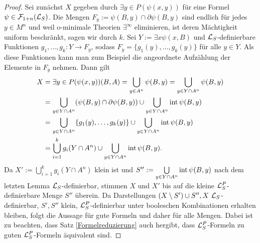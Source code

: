 \begin{proof}
	Sei zunächst $X$ gegeben durch $\exists y\in P(\psi(x,y))$ für eine Formel $\psi\in\mathcal{F}_{1+n}(\mathcal{L}_S)$. Die Mengen $F_y:=\psi(B,y)\cap\partial\psi(B,y)$ sind endlich für jedes $y\in M^n$ und weil o-minimale Theorien $\exists^\infty$ eliminieren, ist deren Mächtigkeit uniform beschränkt, sagen wir durch $k$. Sei $Y:=\exists x\psi(x,B)$ und $\mathcal{L}_S$-definierbare Funktionen $g_1,\dots,g_k:Y\rightarrow F_y$, sodass $F_y=\{g_1(y),\dots,g_k(y)\}$ für alle $y\in Y$. Als diese Funktionen kann man zum Beispiel die angeordnete Aufzählung der Elemente in $F_y$ nehmen. Dann gilt
	\begin{align*}
	X&=\exists y\in P(\psi(x,y))(B,A)=\bigcup\limits_{y\in A^n}\psi(B,y)=\bigcup\limits_{y\in Y\cap A^n}\psi(B,y)\\&=\bigcup\limits_{y\in Y\cap A^n}(\psi(B,y)\cap \partial\psi(B,y))\cup\bigcup\limits_{y\in Y\cap A^n}\operatorname{int}\psi(B,y)\\&=\bigcup\limits_{y\in Y\cap A^n}\{g_1(y),\dots,g_k(y)\}\cup\bigcup\limits_{y\in Y\cap A^n}\operatorname{int}\psi(B,y)\\&=\bigcup\limits_{i=1}^kg_i(Y\cap A^n)\cup \bigcup\limits_{y\in Y\cap A^n}\operatorname{int}\psi(B,y).
	\end{align*}
	Da $X':=\bigcup\limits_{i=1}^kg_i(Y\cap A^n)$ klein ist und $S'':=\bigcup\limits_{y\in Y\cap A^n}\operatorname{int}\psi(B,y)$ nach dem letzten Lemma $\mathcal{L}_S$-definierbar, stimmen $X$ und $X'$ bis auf die kleine $\mathcal{L}^P_S$-definierbare Menge $S''$ überein. Da Darstellungen \glqq{}$(X\setminus  S')\cup S'',X\ \lingua_S$-definierbar, $S',S''$ klein, $\mathcal{L}^P_S$-definierbar\grqq{} unter booleschen Kombinationen erhalten bleiben, folgt die Aussage für gute Formeln und daher für alle Mengen. Dabei ist zu beachten, dass Satz \ref{Formelreduzierung} auch hergibt, dass $\mathcal{L}^P_S$-Formeln zu guten $\mathcal{L}^P_S$-Formeln äquivalent sind.
\end{proof}

